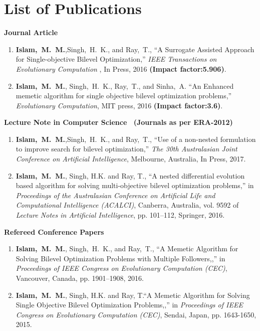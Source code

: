 \chapter*{List of Publications}


\noindent \textbf{Journal Article}
\begin{enumerate}[itemsep = 0em]
\setcounter{enumi}{0}



\item \textbf{Islam,~M.~M.},{Singh,~H.~K.}, and {Ray,~T.}, ``A Surrogate Assisted Approach for Single-objective Bilevel Optimization,'' {\em IEEE Transactions on Evolutionary Computation }, In Press, 2016 \textbf{(Impact factor:5.906)}.
\item \textbf{Islam,~M.~M.}, {Singh,~H.~K.},  {Ray,~T.}, and {Sinha,~A.} ``An Enhanced memetic algorithm for single objective bilevel optimization problems,'' {\em Evolutionary Computation}, MIT press, 2016 \textbf{(Impact factor:3.6)}.
\end{enumerate}

\noindent\textbf{Lecture Note in Computer Science ~(Journals as per ERA-2012)}

\begin{enumerate}[itemsep = 0em]
\setcounter{enumi}{0}

\item \textbf{Islam,~M.~M.},{Singh,~H.~K.}, and {Ray,~T.}, ``Use of a non-nested formulation to improve search for bilevel optimization,'' {\em The 30th  Australasian Joint Conference on Artificial Intelligence}, Melbourne, Australia, In Press, 2017.

\item \textbf{{Islam,~M.~M.}}, {Singh, H.K.} and {Ray, T.}, ``A nested differential evolution based algorithm for solving multi-objective bilevel optimization problems,'' in {\em Proceedings of the Australasian Conference on Artificial Life and Computational Intelligence (ACALCI)}, Canberra, Australia, vol. 9592 of {\em Lecture Notes in Artificial Intelligence}, pp. 101--112, Springer, 2016.


\end{enumerate}
\noindent \textbf{Refereed Conference Papers}
\begin{enumerate}[itemsep = 0em]
\setcounter{enumi}{0}

\item \textbf{Islam,~M.~M.}, {Singh,~H.~K.}, and {Ray,~T.}, ``A Memetic Algorithm for Solving Bilevel Optimization Problems with Multiple Followers,,'' in {\em Proceedings of IEEE Congress on Evolutionary Computation (CEC)}, Vancouver, Canada, pp. 1901--1908, 2016.

\item  \textbf{Islam,~M.~M.}, {Singh, H.K.} and {Ray, T.}``A Memetic Algorithm for Solving Single Objective Bilevel Optimization Problems,,'' in {\em Proceedings of IEEE Congress on Evolutionary Computation (CEC)}, Sendai, Japan, pp. 1643-1650, 2015.
\end{enumerate}

